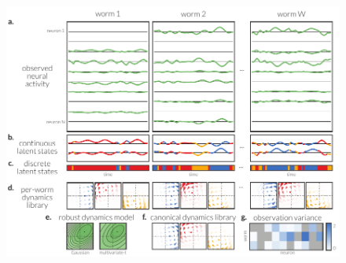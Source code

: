 \documentclass[11pt]{article}
\newcommand{\celegans}{\textit{C. elegans}}
\begin{document}
\begin{figure}[t!]
\centering%
\includegraphics[width=6in]{figures/figure1} 
\caption{
}
\label{fig:model}
\end{figure}
\end{document}
